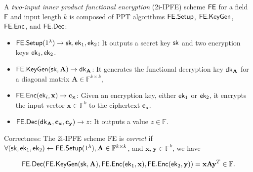 \begin{definition}
\label{def:2i-IPFE}
	A \emph{two-input inner product functional encryption} (2i-IPFE) scheme $\sf FE$ for a field $\mathbb{F}$ and input length $k$ is composed of PPT algorithms ${\sf FE.Setup}$, ${\sf FE.KeyGen}$, ${\sf FE.Enc}$, and ${\sf FE.Dec}$:

	\begin{itemize}
	
		\item ${\sf FE.Setup}(1^\lambda) \to {\sf sk}, {\sf ek}_1, {\sf ek}_2$: It outputs a secret key ${\sf sk}$ and two encryption keys ${\sf ek}_1, {\sf ek}_2$.
	
		\item ${\sf FE.KeyGen}({\sf sk}, \mathbf{A}) \to {\sf dk}_\mathbf{A}$: It generates the functional decryption key ${\sf dk}_\mathbf{A}$ for a diagonal matrix $\mathbf{A} \in \mathbb{F}^{k \times k}$,  
	
		\item ${\sf FE.Enc}({\sf ek}_i, \mathbf{x}) \to \mathbf{c_x}$: Given an encryption key, either ${\sf ek}_1$ or ${\sf ek_2}$, it encrypts the input vector $\mathbf{x} \in \mathbb{F}^k$ to the ciphertext $\mathbf{c_x}$. 
	
		\item ${\sf FE.Dec}({\sf dk}_\mathbf{A}, \mathbf{c_x}, \mathbf{c_y}) \to z$: It outputs a value $z \in \mathbb{F}$.
	
	\end{itemize}
	
	\noindent Correctness: The 2i-IPFE scheme {\sf FE} is \emph{correct} if $\forall ({\sf sk}, {\sf ek}_1, {\sf ek}_2) \gets {\sf FE.Setup}(1^\lambda), \mathbf{A} \in \mathbb{F}^{k \times k}$, and $\mathbf{x}, \mathbf{y} \in \mathbb{F}^k$, we have

	\[
		{\sf FE.Dec}({\sf FE.KeyGen}({\sf sk},  \mathbf{A}), {\sf FE.Enc}({\sf ek}_1, \mathbf{x}), {\sf FE.Enc}({\sf ek}_2, \mathbf{y}) ) = \mathbf{x} \mathbf{A} \mathbf{y}^T \in \mathbb{F}.
	\]

\end{definition}


